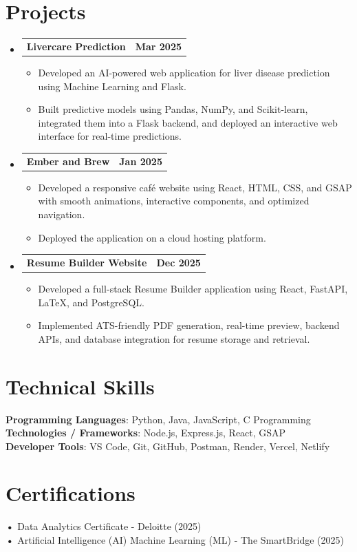 \documentclass[letterpaper,11pt]{article}
\makeatletter
\newcommand{\resumeItem}[1]{
  \item\small{#1}
}
\newcommand{\resumeSubHeadingListStart}{\begin{itemize}[label={}]}
\newcommand{\resumeSubHeadingListEnd}{\end{itemize}}
\newcommand{\resumeItemListStart}{\begin{itemize}}
\newcommand{\resumeItemListEnd}{\end{itemize}}
\newcommand{\resumeProjectHeading}[2]{
  \item
  \begin{tabular*}{\textwidth}{l@{\extracolsep{\fill}}r}
    #1 & \textbf{#2} \\
  \end{tabular*}
}
\makeatother
\begin{document}
\section{Projects}
\resumeSubHeadingListStart
\resumeProjectHeading{\textbf{Livercare Prediction}}{Mar 2025}
\resumeItemListStart
\resumeItem{Developed an AI-powered web application for liver disease prediction using Machine Learning and Flask.}
\resumeItem{Built predictive models using Pandas, NumPy, and Scikit-learn, integrated them into a Flask backend, and deployed an interactive web interface for real-time predictions.}
\resumeItemListEnd
\resumeProjectHeading{\textbf{Ember and Brew}}{Jan 2025}
\resumeItemListStart
\resumeItem{Developed a responsive café website using React, HTML, CSS, and GSAP with smooth animations, interactive components, and optimized navigation.}
\resumeItem{Deployed the application on a cloud hosting platform.}
\resumeItemListEnd
\resumeProjectHeading{\textbf{Resume Builder Website}}{Dec 2025}
\resumeItemListStart
\resumeItem{Developed a full-stack Resume Builder application using React, FastAPI, LaTeX, and PostgreSQL.}
\resumeItem{Implemented ATS-friendly PDF generation, real-time preview, backend APIs, and database integration for resume storage and retrieval.}
\resumeItemListEnd

\resumeSubHeadingListEnd

\section{Technical Skills}
\resumeSubHeadingListStart
\small{\item{
\textbf{Programming Languages}: Python, Java, JavaScript, C Programming \\
\textbf{Technologies / Frameworks}: Node.js, Express.js, React, GSAP \\
\textbf{Developer Tools}: VS Code, Git, GitHub, Postman, Render, Vercel, Netlify \\
}}

\resumeSubHeadingListEnd

\section{Certifications}
\resumeSubHeadingListStart
\small{\item{
\textbf{•} Data Analytics Certificate - Deloitte (2025) \\
\textbf{•} Artificial Intelligence (AI) Machine Learning (ML) - The SmartBridge (2025) \\
}}

\resumeSubHeadingListEnd
\end{document}
